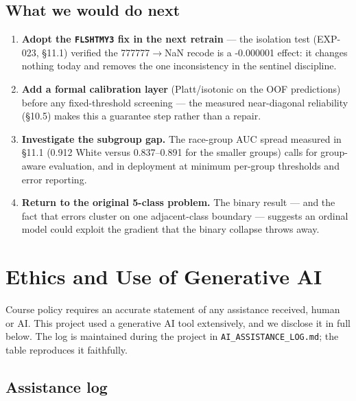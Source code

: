 \documentclass[11pt,a4paper]{article}
\providecommand{\tightlist}{\setlength{\itemsep}{2pt}\setlength{\parskip}{0pt}}
\begin{document}
{\subsection{What we would do next}\label{what-we-would-do-next}

\begin{enumerate}
\def\labelenumi{\arabic{enumi}.}
\tightlist
\item
  \textbf{Adopt the \texttt{FLSHTMY3} fix in the next retrain} --- the isolation test (EXP-023, \S{}11.1) verified the 777777$\rightarrow$NaN recode is a -0.000001 effect: it changes nothing today and removes the one inconsistency in the sentinel discipline.
\item
  \textbf{Add a formal calibration layer} (Platt/isotonic on the OOF predictions) before any fixed-threshold screening --- the measured near-diagonal reliability (\S{}10.5) makes this a guarantee step rather than a repair.
\item
  \textbf{Investigate the subgroup gap.} The race-group AUC spread measured in \S{}11.1 (0.912 White versus 0.837--0.891 for the smaller groups) calls for group-aware evaluation, and in deployment at minimum per-group thresholds and error reporting.
\item
  \textbf{Return to the original 5-class problem.} The binary result --- and the fact that errors cluster on one adjacent-class boundary --- suggests an ordinal model could exploit the gradient that the binary collapse throws away.
\end{enumerate}

\section{Ethics and Use of Generative AI}\label{ethics-and-use-of-generative-ai}

Course policy requires an accurate statement of any assistance received, human or AI. This project used a generative AI tool extensively, and we disclose it in full below. The log is maintained during the project in \texttt{AI\_ASSISTANCE\_LOG.md}; the table reproduces it faithfully.

\subsection{Assistance log}\label{assistance-log}

}
\end{document}
